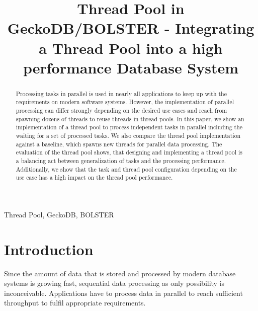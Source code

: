 \documentclass[conference]{IEEEtran}
\begin{document}
\title{Thread Pool in GeckoDB/BOLSTER - Integrating a Thread Pool into a high performance Database System \\
}

\author{
	 \and
}

\maketitle

\begin{abstract}
Processing tasks in parallel is used in nearly all applications to keep up with the requirements on modern software systems. However, the implementation of parallel processing can differ strongly depending on the desired use cases and reach from spawning dozens of threads to reuse threads in thread pools. In this paper, we show an implementation of a thread pool to process independent tasks in parallel including the waiting for a set of processed tasks. We also compare the thread pool implementation against a baseline, which spawns new threads for parallel data processing. The evaluation of the thread pool shows, that designing and implementing a thread pool is a balancing act between generalization of tasks and the processing performance. Additionally, we show that the task and thread pool configuration depending on the use case has a high impact on the thread pool performance.
\end{abstract}

\begin{IEEEkeywords}
Thread Pool, GeckoDB, BOLSTER
\end{IEEEkeywords}

\section{Introduction}
Since the amount of data that is stored and processed by modern database systems is growing fast, sequential data processing as only possibility is inconceivable. Applications have to process data in parallel to reach sufficient throughput to fulfil appropriate requirements. 
\end{document}
